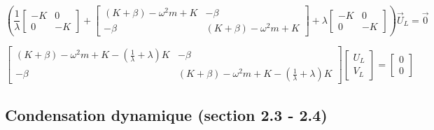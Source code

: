 \documentclass[12pt,a4paper]{article}
\begin{document}
\begin{sol}
\begin{enumerate}
\begin{minipage}[t]{18.5cm}
				\[
				\left(\frac1\lambda \left[\begin{matrix}
					-K & 0 \\
					0 & -K
				\end{matrix}\right]+\left[\begin{matrix}
					(K+\beta)-\omega^2 m + K & -\beta\\
					-\beta & (K+\beta)-\omega^2m+K
				\end{matrix}\right] + \lambda\left[\begin{matrix}
					-K & 0\\
					0 & -K
				\end{matrix}\right]\right)\vec U_L = \vec{0}
				\]
				
				\[
				\left[\begin{matrix}
					(K+\beta)-\omega^2m+K-(\frac1\lambda+\lambda)K & - \beta \\
					-\beta & (K+\beta)-\omega^2m + K-(\frac1\lambda + \lambda)K
				\end{matrix}\right]\left[\begin{matrix}
					U_L \\
					V_L
				\end{matrix}\right] = \left[\begin{matrix}
					0 \\ 0
				\end{matrix}\right]
				\]
			\end{minipage}	
		\end{enumerate}
	\end{sol}
	
	\subsection{Condensation dynamique (section 2.3 - 2.4)}
	
\end{document}
